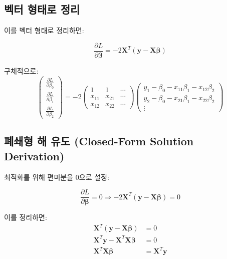 \documentclass[12pt]{article}
\begin{document}
\subsection{벡터 형태로 정리}

이를 벡터 형태로 정리하면:

\begin{equation}
\frac{\partial L}{\partial \boldsymbol{\beta}} = -2\mathbf{X}^T(\mathbf{y} - \mathbf{X}\boldsymbol{\beta})
\end{equation}

구체적으로:
\begin{equation}
\begin{pmatrix}
\frac{\partial L}{\partial \beta_0} \\
\frac{\partial L}{\partial \beta_1} \\
\frac{\partial L}{\partial \beta_2}
\end{pmatrix} = -2 \begin{pmatrix}
1 & 1 & \cdots \\
x_{11} & x_{21} & \cdots \\
x_{12} & x_{22} & \cdots
\end{pmatrix} \begin{pmatrix}
y_1 - \beta_0 - x_{11}\beta_1 - x_{12}\beta_2 \\
y_2 - \beta_0 - x_{21}\beta_1 - x_{22}\beta_2 \\
\vdots
\end{pmatrix}
\end{equation}

\subsection{폐쇄형 해 유도 (Closed-Form Solution Derivation)}

최적화를 위해 편미분을 0으로 설정:

\begin{equation}
\frac{\partial L}{\partial \boldsymbol{\beta}} = 0 \Rightarrow -2\mathbf{X}^T(\mathbf{y} - \mathbf{X}\boldsymbol{\beta}) = 0
\end{equation}

이를 정리하면:
\begin{align}
\mathbf{X}^T(\mathbf{y} - \mathbf{X}\boldsymbol{\beta}) &= 0 \\
\mathbf{X}^T\mathbf{y} - \mathbf{X}^T\mathbf{X}\boldsymbol{\beta} &= 0 \\
\mathbf{X}^T\mathbf{X}\boldsymbol{\beta} &= \mathbf{X}^T\mathbf{y}
\end{align}
\end{document}
